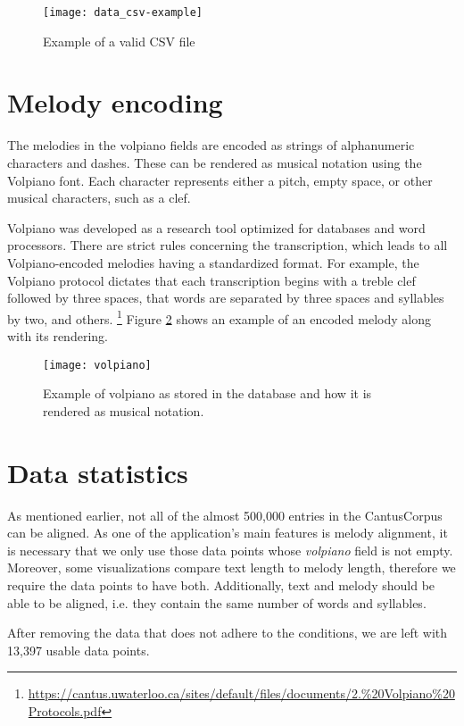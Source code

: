 \begin{figure}[h]
\centering
\texttt{[image: data\_csv-example]}
\caption{Example of a valid CSV file}
\label{fig:csv}
\end{figure}

\section{Melody encoding}

The melodies in the volpiano fields are encoded as strings of alphanumeric characters and dashes. These can be rendered as musical notation using
the Volpiano font. Each character represents either a pitch, empty space, or other musical characters, such as a clef.

Volpiano was developed as a research tool optimized for databases and word processors. There are strict rules concerning the transcription, which leads
to all Volpiano-encoded melodies having a standardized format. For example, the Volpiano protocol dictates that each transcription begins with
a treble clef followed by three spaces, that words are separated by three spaces and syllables by two, and others.
\footnote{\url{https://cantus.uwaterloo.ca/sites/default/files/documents/2.\%20Volpiano\%20Protocols.pdf}} Figure \ref{fig:volpiano} shows an example
of an encoded melody along with its rendering.

\begin{figure}[h!]
\centering
\texttt{[image: volpiano]}
\caption{Example of volpiano as stored in the database and how it is rendered as musical notation. \cite[Figure~2]{cantus_lacoste}}
\label{fig:volpiano}
\end{figure}

\section{Data statistics}

As mentioned earlier, not all of the almost 500,000 entries in the CantusCorpus can be aligned.
As one of the application's main features is melody alignment, it is necessary that we only use those data points whose \emph{volpiano} field is
not empty. Moreover, some visualizations compare text length to melody length, therefore we require the data points to have both. Additionally, 
text and melody should be able to be aligned, i.e. they contain the same number of words and syllables.

After removing the data that does not adhere to the conditions, we are left with 13,397 usable data points.

